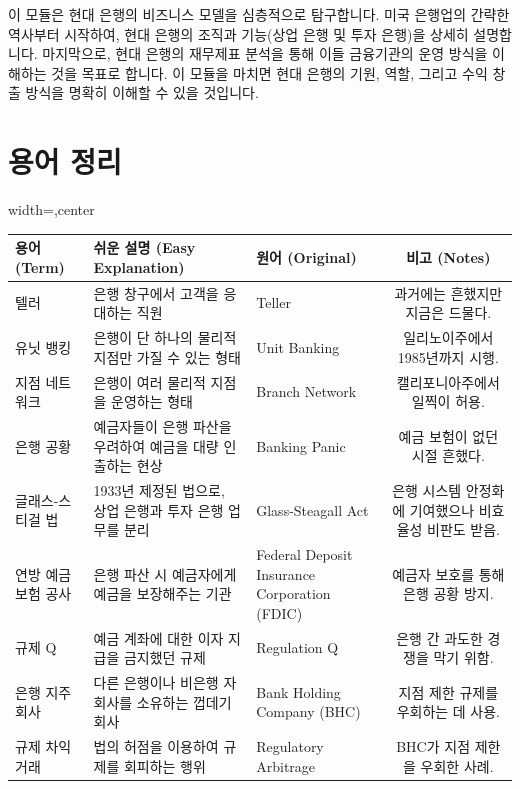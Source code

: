 \documentclass[11pt,a4paper]{book}
\theoremstyle{definition}
\begin{document}
\begin{summarybox}[title={개요: Module 2 핵심 요약}]
이 모듈은 현대 은행의 비즈니스 모델을 심층적으로 탐구합니다. 미국 은행업의 간략한 역사부터 시작하여, 현대 은행의 조직과 기능(상업 은행 및 투자 은행)을 상세히 설명합니다. 마지막으로, 현대 은행의 재무제표 분석을 통해 이들 금융기관의 운영 방식을 이해하는 것을 목표로 합니다. 이 모듈을 마치면 현대 은행의 기원, 역할, 그리고 수익 창출 방식을 명확히 이해할 수 있을 것입니다.
\end{summarybox}


\section{용어 정리}

\begin{adjustbox}{width=\textwidth,center}
\begin{tabular}{lllc}
\toprule
\textbf{용어 (Term)} & \textbf{쉬운 설명 (Easy Explanation)} & \textbf{원어 (Original)} & \textbf{비고 (Notes)} \\
\midrule
텔러 & 은행 창구에서 고객을 응대하는 직원 & Teller & 과거에는 흔했지만 지금은 드물다. \\
유닛 뱅킹 & 은행이 단 하나의 물리적 지점만 가질 수 있는 형태 & Unit Banking & 일리노이주에서 1985년까지 시행. \\
지점 네트워크 & 은행이 여러 물리적 지점을 운영하는 형태 & Branch Network & 캘리포니아주에서 일찍이 허용. \\
은행 공황 & 예금자들이 은행 파산을 우려하여 예금을 대량 인출하는 현상 & Banking Panic & 예금 보험이 없던 시절 흔했다. \\
글래스-스티걸 법 & 1933년 제정된 법으로, 상업 은행과 투자 은행 업무를 분리 & Glass-Steagall Act & 은행 시스템 안정화에 기여했으나 비효율성 비판도 받음. \\
연방 예금 보험 공사 & 은행 파산 시 예금자에게 예금을 보장해주는 기관 & Federal Deposit Insurance Corporation (FDIC) & 예금자 보호를 통해 은행 공황 방지. \\
규제 Q & 예금 계좌에 대한 이자 지급을 금지했던 규제 & Regulation Q & 은행 간 과도한 경쟁을 막기 위함. \\
은행 지주 회사 & 다른 은행이나 비은행 자회사를 소유하는 껍데기 회사 & Bank Holding Company (BHC) & 지점 제한 규제를 우회하는 데 사용. \\
규제 차익 거래 & 법의 허점을 이용하여 규제를 회피하는 행위 & Regulatory Arbitrage & BHC가 지점 제한을 우회한 사례. \\

\end{tabular}
\end{adjustbox}
\end{document}

